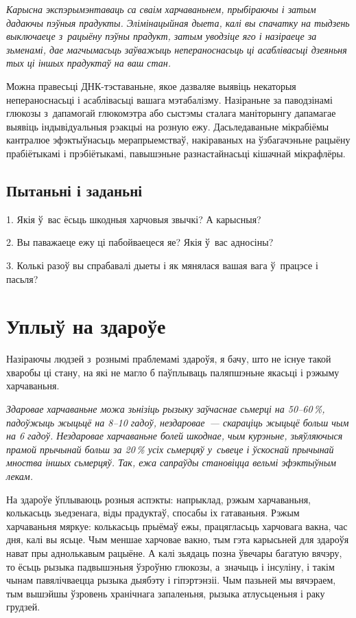\emph{Карысна экспэрымэнтаваць са сваім харчаваньнем, прыбіраючы і затым дадаючы пэўныя прадукты. Элімінацыйная дыета, калі вы спачатку на тыдзень выключаеце з~рацыёну пэўны прадукт, затым уводзіце яго і назіраеце за зьменамі, дае магчымасьць заўважыць непераноснасьць ці асаблівасьці дзеяньня тых ці іншых прадуктаў на ваш стан.}

Можна правесьці ДНК-тэставаньне, якое дазваляе выявіць некаторыя непераноснасьці і асаблівасьці вашага мэтабалізму. Назіраньне за паводзінамі глюкозы з~дапамогай глюкомэтра або сыстэмы сталага маніторынгу дапамагае выявіць індывідуальныя рэакцыі на розную ежу. Дасьледаваньне мікрабіёмы кантралюе эфэктыўнасьць мерапрыемстваў, накіраваных на ўзбагачэньне рацыёну прабіётыкамі і прэбіётыкамі, павышэньне разнастайнасьці кішачнай мікрафлёры.

\subsection*{Пытаньні і заданьні}

1. Якія ў~вас ёсьць шкодныя харчовыя звычкі? А карысныя?

2. Вы паважаеце ежу ці пабойваецеся яе? Якія ў~вас адносіны?

3. Колькі разоў вы спрабавалі дыеты і як мянялася вашая вага ў~працэсе і пасьля?


\section{Уплыў на здароўе}

Назіраючы людзей з~рознымі праблемамі здароўя, я бачу, што не існуе такой хваробы ці стану, на які не магло б паўплываць паляпшэньне якасьці і рэжыму харчаваньня. 

\emph{Здаровае харчаваньне можа зьнізіць рызыку заўчаснае сьмерці на 50--60\,\%, падоўжыць жыцьцё на 8--10 гадоў, нездаровае~--- скараціць жыцьцё больш чым на 6 гадоў. Нездаровае харчаваньне болей шкоднае, чым курэньне, зьяўляючыся прамой прычынай больш за 20\,\% усіх сьмерцяў у~сьвеце і ўскоснай прычынай мноства іншых сьмерцяў. Так, ежа сапраўды становіцца вельмі эфэктыўным лекам.} 


На здароўе ўплываюць розныя аспэкты: напрыклад, рэжым харчаваньня, колькасьць зьедзенага, віды прадуктаў, спосабы іх гатаваньня. Рэжым харчаваньня мяркуе: колькасьць прыёмаў ежы, працягласьць харчовага вакна, час дня, калі вы ясьце. Чым меншае харчовае вакно, тым гэта карысьней для здароўя нават пры аднолькавым рацыёне. А калі зьядаць позна ўвечары багатую вячэру, то ёсьць рызыка падвышэньня ўзроўню глюкозы, а~значыць і інсуліну, і такім чынам павялічваецца рызыка дыябэту і гіпэртэнзіі. Чым пазьней мы вячэраем, тым вышэйшы ўзровень хранічнага запаленьня, рызыка атлусьценьня і раку грудзей.

